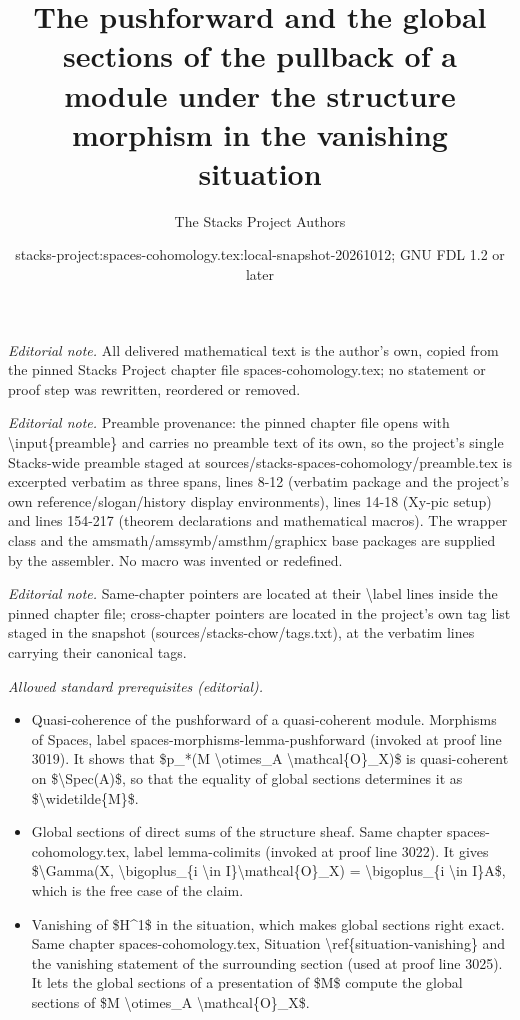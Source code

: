 \documentclass[10pt,a4paper]{amsart}
\title{The pushforward and the global sections of the pullback of a module under the structure morphism in the vanishing situation}
\author{The Stacks Project Authors}
\date{stacks-project:spaces-cohomology.tex:local-snapshot-20261012; GNU FDL 1.2 or later}
\theoremstyle{plain}
\theoremstyle{definition}
\theoremstyle{remark}
\numberwithin{equation}{subsection}
\begin{document}
\maketitle
\noindent\textit{Editorial note.} All delivered mathematical text is the author's own, copied from the pinned Stacks Project chapter file spaces-cohomology.tex; no statement or proof step was rewritten, reordered or removed.\par\medskip
\noindent\textit{Editorial note.} Preamble provenance: the pinned chapter file opens with \textbackslash{}input\{preamble\} and carries no preamble text of its own, so the project's single Stacks-wide preamble staged at sources/stacks-spaces-cohomology/preamble.tex is excerpted verbatim as three spans, lines 8-12 (verbatim package and the project's own reference/slogan/history display environments), lines 14-18 (Xy-pic setup) and lines 154-217 (theorem declarations and mathematical macros). The wrapper class and the amsmath/amssymb/amsthm/graphicx base packages are supplied by the assembler. No macro was invented or redefined.\par\medskip
\noindent\textit{Editorial note.} Same-chapter pointers are located at their \textbackslash{}label lines inside the pinned chapter file; cross-chapter pointers are located in the project's own tag list staged in the snapshot (sources/stacks-chow/tags.txt), at the verbatim lines carrying their canonical tags.\par\medskip
\noindent\textit{Allowed standard prerequisites (editorial).}\begin{itemize}
\item Quasi-coherence of the pushforward of a quasi-coherent module. Morphisms of Spaces, label spaces-morphisms-lemma-pushforward (invoked at proof line 3019). It shows that \$p\_*(M \textbackslash{}otimes\_A \textbackslash{}mathcal\{O\}\_X)\$ is quasi-coherent on \$\textbackslash{}Spec(A)\$, so that the equality of global sections determines it as \$\textbackslash{}widetilde\{M\}\$.
\item Global sections of direct sums of the structure sheaf. Same chapter spaces-cohomology.tex, label lemma-colimits (invoked at proof line 3022). It gives \$\textbackslash{}Gamma(X, \textbackslash{}bigoplus\_\{i \textbackslash{}in I\}\textbackslash{}mathcal\{O\}\_X) = \textbackslash{}bigoplus\_\{i \textbackslash{}in I\}A\$, which is the free case of the claim.
\item Vanishing of \$H\textasciicircum{}1\$ in the situation, which makes global sections right exact. Same chapter spaces-cohomology.tex, Situation \textbackslash{}ref\{situation-vanishing\} and the vanishing statement of the surrounding section (used at proof line 3025). It lets the global sections of a presentation of \$M\$ compute the global sections of \$M \textbackslash{}otimes\_A \textbackslash{}mathcal\{O\}\_X\$.
\end{itemize}\medskip
\end{document}
